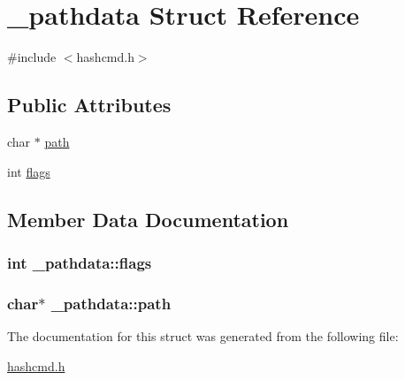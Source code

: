 \hypertarget{struct__pathdata}{}\section{\+\_\+pathdata Struct Reference}
\label{struct__pathdata}


{\ttfamily \#include $<$hashcmd.\+h$>$}

\subsection*{Public Attributes}
\begin{DoxyCompactItemize}
\item 
char $\ast$ \hyperlink{struct__pathdata_a986cc5fdc40edc32bcee0da5fa66116e}{path}
\item 
int \hyperlink{struct__pathdata_ab71211e2211c40698401f36c4312e234}{flags}
\end{DoxyCompactItemize}


\subsection{Member Data Documentation}
\subsubsection[{\texorpdfstring{flags}{flags}}]{\setlength{\rightskip}{0pt plus 5cm}int \+\_\+pathdata\+::flags}\hypertarget{struct__pathdata_ab71211e2211c40698401f36c4312e234}{}\label{struct__pathdata_ab71211e2211c40698401f36c4312e234}
\subsubsection[{\texorpdfstring{path}{path}}]{\setlength{\rightskip}{0pt plus 5cm}char$\ast$ \+\_\+pathdata\+::path}\hypertarget{struct__pathdata_a986cc5fdc40edc32bcee0da5fa66116e}{}\label{struct__pathdata_a986cc5fdc40edc32bcee0da5fa66116e}


The documentation for this struct was generated from the following file\+:\begin{DoxyCompactItemize}
\item 
\hyperlink{hashcmd_8h}{hashcmd.\+h}\end{DoxyCompactItemize}
